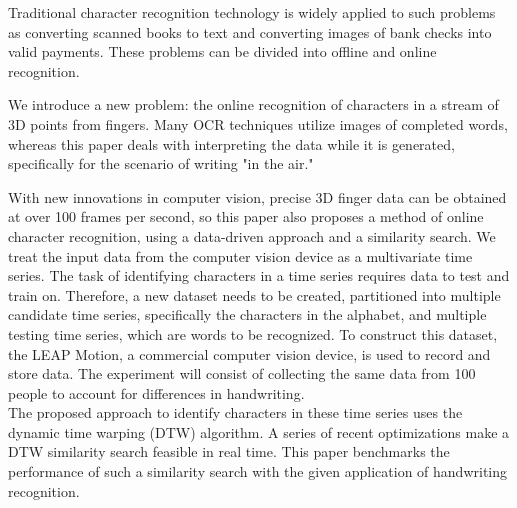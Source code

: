 Traditional character recognition technology is widely applied to such problems as converting scanned books to text and converting images of bank checks into valid payments. These problems can be divided into offline and online recognition. 

We introduce a new problem: the online recognition of characters in a stream of 3D points from fingers. Many OCR techniques utilize images of completed words, whereas this paper deals with interpreting the data while it is generated, specifically for the scenario of writing "in the air."  

With new innovations in computer vision, precise 3D finger data can be obtained at over 100 frames per second, so this paper also proposes a method of online character recognition, using a data-driven approach and a similarity search. We treat the input data from the computer vision device as a multivariate time series.
The task of identifying characters in a time series requires data to test and train on. Therefore, a new dataset needs to be created, partitioned into multiple candidate time series, specifically the characters in the alphabet, and multiple testing time series, which are words to be recognized. To construct this dataset, the LEAP Motion, a commercial computer vision device, is used to record and store data. The experiment will consist of collecting the same data from 100 people to account for differences in handwriting.\\
The proposed approach to identify characters in these time series uses the dynamic time warping (DTW) algorithm. A series of recent optimizations make a DTW similarity search feasible in real time. This paper benchmarks the performance of such a similarity search with the given application of handwriting recognition.\\
